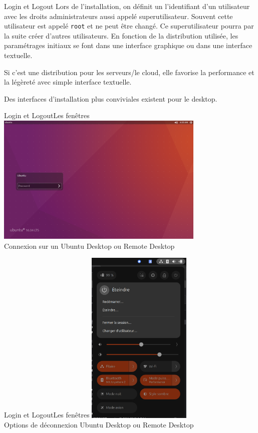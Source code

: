 \documentclass{beamer}
\begin{document}
    \begin{frame}{Login et Logout}
        Lors de l'installation, on définit un l'identifiant d'un utilisateur avec les droits administrateurs aussi appelé superutilisateur.
        Souvent cette utilisateur est appelé \lstinline{root} et ne peut être changé.
        \bigbreak
        Ce superutilisateur pourra par la suite créer d'autres utilisateurs.
        \bigbreak
        En fonction de la distribution utilisée, les paramétrages initiaux se font dans une interface graphique ou dans une interface textuelle.

        Si c'est une distribution pour les serveurs/le cloud, elle favorise la performance et la légèreté avec simple interface textuelle.

        Des interfaces d'installation plus conviviales existent pour le desktop.
    \end{frame}

    \begin{frame}{Login et Logout}{Les fenêtres}
        \centering
        \includegraphics[width=10cm]{image/Ubuntu-login-screen} \\ Connexion sur un Ubuntu Desktop ou Remote Desktop \\
    \end{frame}

    \begin{frame}{Login et Logout}{Les fenêtres}
        \centering
        \includegraphics[width=5cm]{image/Ubuntu-logout-screen} \\ Options de déconnexion Ubuntu Desktop ou Remote Desktop \\
    \end{frame}
\end{document}
